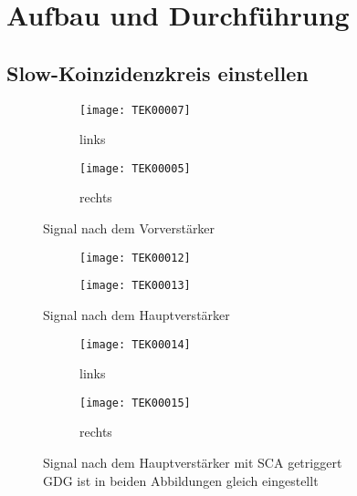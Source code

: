 \documentclass[11pt, ngerman, fleqn, DIV=15, headinclude, BCOR=2cm]{scrreprt}
\begin{document}
\chapter{Aufbau und Durchführung}

\section{Slow-Koinzidenzkreis einstellen}

\begin{figure}
	\centering
	\begin{subfigure}{0.49 \textwidth}
		\texttt{[image: TEK00007]}
		\caption{%
			links
		}
		\label{fig:slow_signal-li}
	\end{subfigure}
	\begin{subfigure}{0.49 \textwidth}
		\texttt{[image: TEK00005]}
		\caption{%
			rechts
		}
		\label{fig:slow_signal-re}
	\end{subfigure}
	\caption{%
		Signal nach dem Vorverstärker
	}
	\label{fig:slow_signal}
\end{figure}

\begin{figure}
	\centering
	\begin{subfigure}{0.49 \textwidth}
		\texttt{[image: TEK00012]}
	\end{subfigure}
	\begin{subfigure}{0.49 \textwidth}
		\texttt{[image: TEK00013]}
	\end{subfigure}
	\caption{%
		Signal nach dem Hauptverstärker
	}
	\label{fig:slow_signal_hv}
\end{figure}

\begin{figure}
	\centering
	\begin{subfigure}{0.49 \textwidth}
		\texttt{[image: TEK00014]}
		\caption{%
			links
		}
		\label{fig:slow_signal_sca_trig-li}
	\end{subfigure}
	\begin{subfigure}{0.49 \textwidth}
		\texttt{[image: TEK00015]}
		\caption{%
			rechts
		}
		\label{fig:slow_signal_sca_trig-re}
	\end{subfigure}
	\caption{%
		Signal nach dem Hauptverstärker mit SCA getriggert\\
		GDG ist in beiden Abbildungen gleich eingestellt
	}
	\label{fig:slow_signal_sca_trig}
\end{figure}
\end{document}
